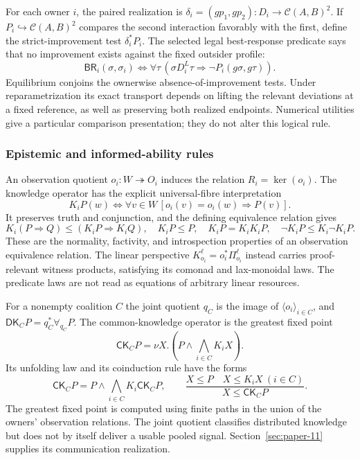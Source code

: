 \documentclass[11pt,a4paper]{article}
\numberwithin{equation}{section}
\theoremstyle{definition}
\theoremstyle{remark}
\theoremstyle{plain}
\begin{document}
For each owner $i$, the paired realization is
$\delta_i=(gp_1,gp_2):D_i\to\mathcal C(A,B)^2$.  If
$P_i\hookrightarrow\mathcal C(A,B)^2$ compares the second interaction
favorably with the first, define the strict-improvement test
$\delta_i^*P_i$.  The selected legal best-response predicate says that
no improvement exists against the fixed outsider profile:
\[
\mathsf{BR}_i(\sigma,\sigma_i)
\Longleftrightarrow
\forall\tau\,(
\sigma D_i^L\tau\Rightarrow\neg P_i(g\sigma,g\tau)).
\]
Equilibrium conjoins the ownerwise absence-of-improvement tests.
Under reparametrization its exact transport depends on lifting the
relevant deviations at a fixed reference, as well as preserving both
realized endpoints. Numerical utilities give a particular comparison
presentation; they do not alter this logical rule.

\subsubsection{Epistemic and informed-ability rules}

An observation quotient $o_i:W\twoheadrightarrow O_i$ induces the
relation $R_i=\ker(o_i)$.  The knowledge operator has the explicit
universal-fibre interpretation
\[
K_iP(w)\iff\forall v\in W
\,[o_i(v)=o_i(w)\Rightarrow P(v)].
\]
It preserves truth and conjunction, and the defining equivalence
relation gives
\[
K_i(P\Rightarrow Q)\leq(K_iP\Rightarrow K_iQ),
\quad K_iP\leq P,\quad K_iP=K_iK_iP,
\quad\neg K_iP\leq K_i\neg K_iP.
\]
These are the normality, factivity, and introspection properties of
an observation equivalence relation. The linear perspective
$K_{o_i}^\ell=o_i^*\Pi_{o_i}^\ell$ instead carries proof-relevant
witness products, satisfying its comonad and lax-monoidal laws.
The predicate laws are not read as equations of arbitrary linear
resources.

For a nonempty coalition $C$ the joint quotient $q_C$ is the image of
$\langle o_i\rangle_{i\in C}$, and
$\mathsf{DK}_CP=q_C^*\forall_{q_C}P$.  The common-knowledge operator
is the greatest fixed point
\[
\mathsf{CK}_CP
=\nu X.\left(P\wedge\bigwedge_{i\in C}K_iX\right).
\]
Its unfolding law and its coinduction rule have the forms
\[
\mathsf{CK}_CP=P\wedge\bigwedge_{i\in C}K_i\mathsf{CK}_CP,
\qquad
\frac{X\leq P\quad X\leq K_iX\ (i\in C)}{X\leq\mathsf{CK}_CP}.
\]
The greatest fixed point is computed using finite paths in the
union of the owners' observation relations. The joint quotient
classifies distributed knowledge but does not by itself deliver a
usable pooled signal. Section~\ref{sec:paper-11} supplies its
communication realization.
\end{document}
